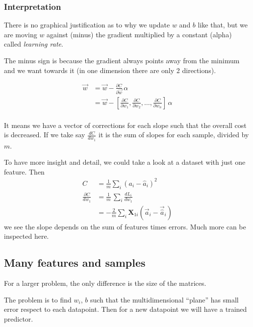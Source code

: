 \subsubsection{Interpretation}

There is no graphical justification as to why we update $w$ and $b$ like that, but we are moving $w$ against (minus) the gradient multiplied by a constant (alpha) called \textit{learning rate}.

The minus sign is because the gradient always points away from the minimum and we want towards it (in one dimension there are only 2 directions). 

\begin{align}
  \vec{w} &= \vec{w} -\frac{\partial C}{\partial \vec{w}}\,\alpha\\
  &= \vec{w} -[\frac{\partial C}{\partial w_1}, \frac{\partial C}{\partial w_2},\ldots, \frac{\partial C}{\partial w_n}]\,\alpha\\
\end{align}

It means we have a vector of corrections for each slope such that the overall cost is decreased. If we take say $\frac{dC}{dw_1}$ it is the sum of slopes for each sample, divided by $m$. 

To have more insight and detail, we could take a look at a dataset with just one feature. Then 
\begin{align*}
  C &= \frac{1}{m}\sum_i(a_i - \hat{a}_i)^2 \\ 
  \frac{\partial C}{dw_1}&= \frac{1}{m}\,\sum_i \frac{dL_i}{dw_1} \\
  &= -\frac{2}{m}\sum_i \mathbf{X}_{1i}(\vec{a}_i-\vec{\hat{a}}_i)
\end{align*}
we see the slope depends on the sum of features times errors. Much more can be inspected here.


\subsection{Many features and samples}
For a larger problem, the only difference is the size of the matrices.

The problem is to find $w_i$, $b$ such that the multidimensional ``plane'' has small error respect to each datapoint. Then for a new datapoint we will have a trained predictor.


